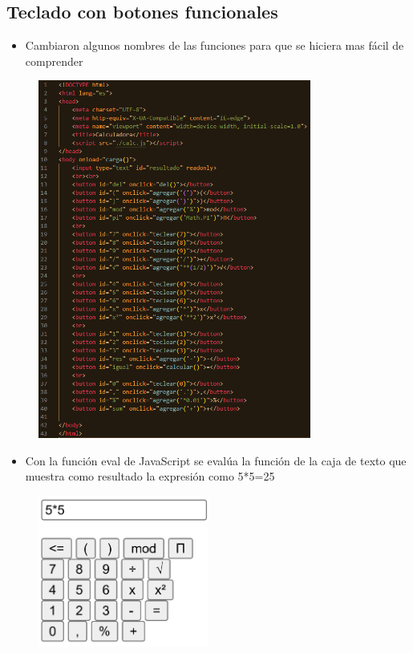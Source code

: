 \documentclass{article}
\begin{document}
\subsection{Teclado con botones funcionales}
	\begin{itemize}	
		\item Cambiaron algunos nombres de las funciones para que se hiciera mas fácil de comprender
	\end{itemize}
	\begin{figure}[H]
		\centering
		\includegraphics[width=0.8\textwidth,keepaspectratio]{src/e1/calc02.png}
	\end{figure}
	\begin{itemize}	
		\item Con la función eval de JavaScript se evalúa la función de la caja de texto
		que muestra como resultado la expresión como 5*5=25
	\end{itemize}
	
	\begin{figure}[H]
		\centering
		\includegraphics[width=0.5\textwidth,keepaspectratio]{img/calc02.png}
	\end{figure}
\end{document}
